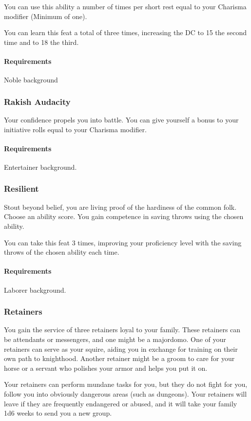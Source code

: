     You can use this ability a number of times per short rest equal to your Charisma modifier (Minimum of one).

    You can learn this feat a total of three times, increasing the DC to 15 the second time and to 18 the third.
    \paragraph{Requirements} Noble background
\subsubsection{Rakish Audacity} \label{feat::rakishaudacity}
    Your confidence propels you into battle.
    You can give yourself a bonus to your initiative rolls equal to your Charisma modifier.
    \paragraph{Requirements} Entertainer background.
\subsubsection{Resilient} \label{feat::resilient}
    Stout beyond belief, you are living proof of the hardiness of the common folk.
    Choose an ability score.
    You gain competence in saving throws using the chosen ability.

    You can take this feat 3 times, improving your proficiency level with the saving throws of the chosen ability each time.
    \paragraph{Requirements} Laborer background.
\subsubsection{Retainers} \label{feat::retainers}
    You gain the service of three retainers loyal to your family.
    These retainers can be attendants or messengers, and one might be a majordomo.
    One of your retainers can serve as your squire, aiding you in exchange for training on their own path to knighthood.
    Another retainer might be a groom to care for your horse or a servant who polishes your armor and helps you put it on.

    Your retainers can perform mundane tasks for you, but they do not fight for you, follow you into obviously dangerous areas (such as dungeons).
    Your retainers will leave if they are frequently endangered or abused, and it will take your family 1d6 weeks to send you a new group.
